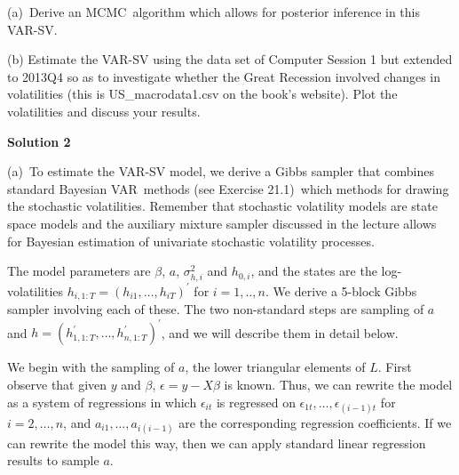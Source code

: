 \documentclass{article}
\begin{document}
(a)\ Derive an MCMC\ algorithm which allows for posterior inference in this
VAR-SV.

(b) Estimate the VAR-SV using the data set of Computer Session 1 but
extended to 2013Q4 so as to investigate whether the Great Recession involved
changes in volatilities (this is US\_macrodata1.csv on the book's website).
Plot the volatilities and discuss your results.

\textbf{Solution 2}

(a)\ To estimate the VAR-SV model, we derive a Gibbs sampler that combines
standard Bayesian VAR\ methods (see Exercise 21.1)\ which methods for
drawing the stochastic volatilities. Remember that stochastic volatility
models are state space models and the auxiliary mixture sampler discussed in
the lecture allows for Bayesian estimation of univariate stochastic
volatility processes.

The model parameters are $\beta $, $a$, $\sigma _{h,i}^{2}$ and $h_{0,i}$,
and the states are the log-volatilities $h_{i,1:T}=(h_{i1},\ldots
,h_{iT})^{\prime }$ for $i=1,..,n.$ We derive a 5-block Gibbs sampler
involving each of these. The two non-standard steps are sampling of $a$ and $%
h=(h_{1,1:T}^{\prime },\ldots ,h_{n,1:T}^{\prime })^{\prime }$, and we will
describe them in detail below.

We begin with the sampling of $a$, the lower triangular elements of $L$.
First observe that given $y$ and $\beta $, $\epsilon =y-X\beta $ is known.
Thus, we can rewrite the model as a system of regressions in which $\epsilon
_{it}$ is regressed on $\epsilon _{1t},\ldots ,\epsilon _{(i-1)t}$ for $%
i=2,\ldots ,n$, and $a_{i1},\ldots ,a_{i(i-1)}$ are the corresponding
regression coefficients. If we can rewrite the model this way, then we can
apply standard linear regression results to sample $a$.
\end{document}
